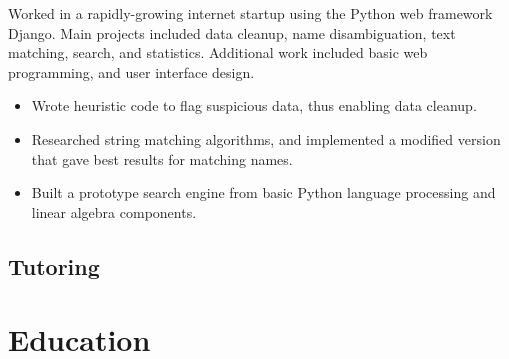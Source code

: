 \documentclass[11pt,a4paper,sans]{moderncv} %
\begin{document}
{Worked in a rapidly-growing internet startup using the Python web framework Django.  Main projects included data cleanup, name disambiguation, text matching, search, and statistics.  Additional work included basic web programming, and user interface design.  
\begin{itemize}
	\item Wrote heuristic code to flag suspicious data, thus enabling data cleanup.
	\item Researched string matching algorithms, and implemented a modified version that gave best results for matching names.
	\item Built a prototype search engine from basic Python language processing and linear algebra components.
\end{itemize}
}


\subsection{Tutoring}


\section{Education}
\end{document}
